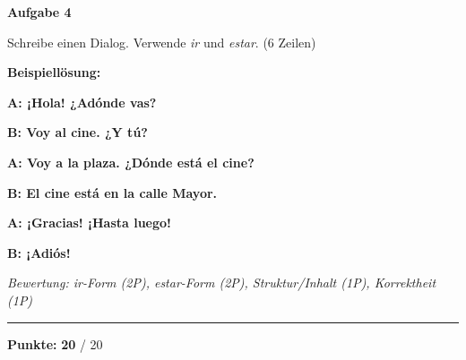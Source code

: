 \documentclass[11pt, a4paper]{article}
\newcommand{\fachfarbe}{spanisch}
\newcommand{\maxpunkte}{20}
\newcommand{\punktebox}[1]{\hfill\fbox{\small \_/#1}}
\newcommand{\loesung}[1]{\textcolor{loesung}{\textbf{#1}}}
\newenvironment{aufgabe}[1]{%
    \vspace{10pt}
    \noindent\textbf{\textcolor{\fachfarbe}{Aufgabe #1}}
    \vspace{5pt}
    \begin{list}{}{\leftmargin=0pt}
    \item[]
}{%
    \end{list}
}
\begin{document}

\begin{aufgabe}{4}
Schreibe einen Dialog. Verwende \textit{ir} und \textit{estar}. (6 Zeilen) \punktebox{6}
\end{aufgabe}

\textbf{Beispiellösung:}

\loesung{A: ¡Hola! ¿Adónde vas?}

\loesung{B: Voy al cine. ¿Y tú?}

\loesung{A: Voy a la plaza. ¿Dónde está el cine?}

\loesung{B: El cine está en la calle Mayor.}

\loesung{A: ¡Gracias! ¡Hasta luego!}

\loesung{B: ¡Adiós!}

\vspace{0.5em}
\textit{\textcolor{grau}{Bewertung: ir-Form (2P), estar-Form (2P), Struktur/Inhalt (1P), Korrektheit (1P)}}

\vspace{20pt}
\hrule
\vspace{10pt}

\begin{flushright}
\textbf{Punkte:} \loesung{\maxpunkte} / \maxpunkte
\end{flushright}
\end{document}
